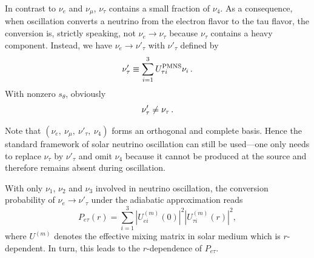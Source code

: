 \documentclass[aps,prd,twocolumn,preprintnumbers,superscriptaddress,nofootinbib]{revtex4-1}
\begin{document}
In contrast to $\nu_{e}$ and $\nu_{\mu}$, $\nu_{\tau}$ contains
a small fraction of $\nu_{4}$. As a consequence, when oscillation
converts a neutrino from the electron flavor to the tau flavor, the
conversion is, strictly speaking, not $\nu_{e}\to\nu_{\tau}$ because
$\nu_{\tau}$ contains a heavy component. Instead, we have $\nu_{e}\to\nu'_{\tau}$
with $\nu'_{\tau}$ defined by
\begin{equation}
\nu'_{\tau}\equiv\sum_{i=1}^{3}U_{\tau i}^{\text{PMNS}}\nu_{i}\thinspace.\label{eq:-30}
\end{equation}
With nonzero $s_{\theta}$, obviously
\begin{equation}
\nu'_{\tau}\neq\nu_{\tau}\thinspace.\label{eq:-31}
\end{equation}

Note that $(\nu_{e},\ \nu_{\mu},\ \nu'_{\tau},\ \nu_{4})$ forms an
orthogonal and complete basis. Hence the standard framework of solar
neutrino oscillation can still be used---one only needs to replace
$\nu_{\tau}$ by $\nu'_{\tau}$ and omit $\nu_{4}$ because it cannot
be produced at the source and therefore remains absent during oscillation. 

With only $\nu_{1}$, $\nu_{2}$ and $\nu_{3}$ involved in neutrino
oscillation, the conversion probability of $\nu_{e}\to\nu'_{\tau}$
under the adiabatic approximation reads~\cite{Xu:2022wcq}
\begin{equation}
P_{e\tau}(r)=\sum_{i=1}^{3}|U_{ei}^{(m)}(0)|^{2}|U_{\tau i}^{(m)}(r)|^{2},\label{eq:-32}
\end{equation}
where $U^{(m)}$ denotes the effective mixing matrix in solar medium
which is $r$-dependent. In turn, this leads to the $r$-dependence of $P_{e\tau}$. 
\end{document}
